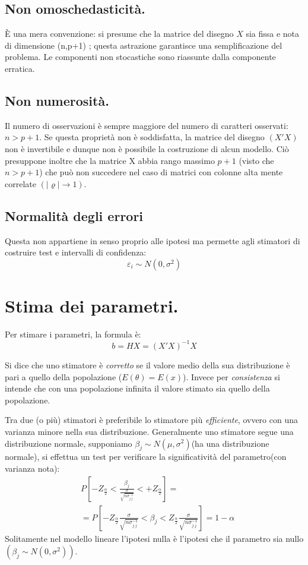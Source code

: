 \documentclass[11pt, twocolumn]{article}
\begin{document}
\subsection*{Non omoschedasticità.}
È una mera convenzione: si presume che la matrice del disegno $X$ sia fissa e nota di dimensione (n,p+1) ; questa astrazione garantisce una semplificazione del problema.
Le componenti non stocastiche sono riassunte dalla componente erratica.

\subsection*{Non numerosità.}
Il numero di osservazioni è sempre maggiore del numero di caratteri osservati: $n > p + 1$.
Se questa proprietà non è soddisfatta, la matrice del disegno $(X'X)$ non è invertibile e dunque non è possibile la costruzione di alcun modello. Ciò presuppone inoltre che la matrice X abbia rango massimo $p + 1$ (visto che $n > p + 1$) che può non succedere nel caso di matrici con colonne alta mente correlate $(|\varrho| \to 1)$.
\subsection*{Normalità degli errori}
Questa non appartiene in senso proprio alle ipotesi ma permette agli stimatori di costruire test e intervalli di confidenza:
$$\varepsilon_i \sim N(0,\sigma^2)$$


\section{Stima dei parametri.}
Per stimare i parametri, la formula è:
\begin{equation*}
  b = HX = (X'X)^{-1}X
\end{equation*}

Si dice che uno stimatore è \textit{corretto} se il valore medio della sua distribuzione è pari a quello della popolazione ($E(\theta) = E(x)$).
Invece per \textit{consistenza} si intende che con una popolazione infinita il valore stimato sia quello della popolazione.

Tra due (o più) stimatori è preferibile lo stimatore più \textit{efficiente}, ovvero con una varianza minore nella sua distribuzione.
Generalmente uno stimatore segue una distribuzione normale, supponiamo $\beta_j \sim N(\mu,\sigma^2)$(ha una distribuzione normale), si effettua un test per verificare la significatività del parametro(con varianza nota):
\begin{align*}
  &P[-Z_{\frac{\alpha}{2}} < \frac{\beta_j}{\frac{\sigma}{\sqrt{n\sigma^{-1}_{j.j}}}} < +Z_{\frac{\alpha}{2}}] = \\
  &= P[-Z_{\frac{\alpha}{2}} \frac{\sigma}{\sqrt{n\sigma^{-1}_{j.j}}} < \beta_j < Z_{\frac{\alpha}{2}} \frac{\sigma}{\sqrt{n\sigma^{-1}_{j.j}}}] = 1 - \alpha
\end{align*}
Solitamente nel modello lineare l'ipotesi nulla è l'ipotesi che il parametro sia nullo $(\beta_j \sim N(0,\sigma^2))$.
\end{document}
